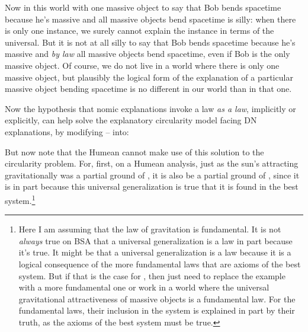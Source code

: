 Now in this world with one massive object to say that Bob bends spacetime because he's massive and all massive objects bend spacetime 
is silly: when there is only one instance, we surely cannot explain the instance in terms of the universal.
But it is not at all silly to say that Bob bends spacetime because he's massive and \textit{by law} all massive objects bend
spacetime,  even if Bob is the only massive object. Of course, we do not live in a world where there is only one massive object, but plausibly the logical form of the explanation of a particular massive object bending spacetime is no different in 
our world than in that one.

Now the hypothesis that nomic explanations invoke a law \textit{as a law}, implicitly or explicitly, can help solve the explanatory 
circularity model facing DN explanations, by modifying -- into:

But now note that the Humean cannot make use of this solution to the circularity problem. For, first, on a Humean analysis, just as 
the sun's attracting gravitationally was a partial ground of , it is also be a partial ground of , 
since it is in part because this universal generalization is true that it is found in the best 
system.\footnote{Here I am assuming that the law of gravitation is fundamental. It is not \textit{always} true on BSA that a universal generalization is a law in part because it's true. 
It might be that a universal generalization is a law because it is a logical consequence of the more fundamental laws that are axioms of the 
best system. But if that is the case for , then just need to replace the example with a more fundamental one or work 
in a world where the universal gravitational attractiveness of massive objects is a fundamental law. For the 
fundamental laws, their inclusion in the system is explained in part by their truth, as the axioms of the best system must
be true.} 

